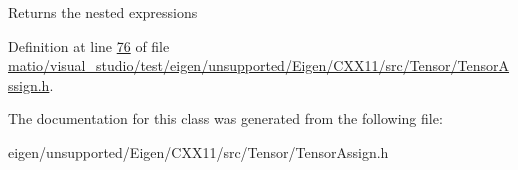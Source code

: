 \begin{DoxyReturn}{Returns}
the nested expressions 
\end{DoxyReturn}


Definition at line \hyperlink{matio_2visual__studio_2test_2eigen_2unsupported_2_eigen_2_c_x_x11_2src_2_tensor_2_tensor_assign_8h_source_l00076}{76} of file \hyperlink{matio_2visual__studio_2test_2eigen_2unsupported_2_eigen_2_c_x_x11_2src_2_tensor_2_tensor_assign_8h_source}{matio/visual\+\_\+studio/test/eigen/unsupported/\+Eigen/\+C\+X\+X11/src/\+Tensor/\+Tensor\+Assign.\+h}.



The documentation for this class was generated from the following file\+:\begin{DoxyCompactItemize}
\item 
eigen/unsupported/\+Eigen/\+C\+X\+X11/src/\+Tensor/\+Tensor\+Assign.\+h\end{DoxyCompactItemize}
